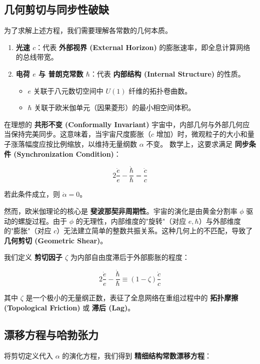\subsection{几何剪切与同步性破缺}

为了求解上述方程，我们需要理解各常数的几何本质。

\begin{enumerate}
\item \textbf{光速 $c$}：代表 \textbf{外部视界 (External Horizon)} 的膨胀速率，即全息计算网络的总线带宽。
\item \textbf{电荷 $e$ 与 普朗克常数 $\hbar$}：代表 \textbf{内部结构 (Internal Structure)} 的性质。
   \begin{itemize}
   \item $e$ 关联于八元数切空间中 $U(1)$ 纤维的拓扑卷曲数。
   \item $\hbar$ 关联于欧米伽单元（因果菱形）的最小相空间体积。
   \end{itemize}
\end{enumerate}

在理想的 \textbf{共形不变 (Conformally Invariant)} 宇宙中，内部几何与外部几何应当保持完美同步。这意味着，当宇宙尺度膨胀（$c$ 增加）时，微观粒子的大小和量子涨落幅度应按比例缩放，以维持无量纲数 $\alpha$ 不变。
数学上，这要求满足 \textbf{同步条件 (Synchronization Condition)}：

\[2\frac{\dot{e}}{e} - \frac{\dot{\hbar}}{\hbar} = \frac{\dot{c}}{c}\]

若此条件成立，则 $\dot{\alpha} = 0$。

然而，欧米伽理论的核心是 \textbf{斐波那契非周期性}。宇宙的演化是由黄金分割率 $\phi$ 驱动的螺旋过程。由于 $\phi$ 的无理性，内部维度的"旋转"（对应 $e, \hbar$）与外部维度的"膨胀"（对应 $c$）无法建立简单的整数共振关系。这种几何上的不匹配，导致了 \textbf{几何剪切 (Geometric Shear)}。

我们定义 \textbf{剪切因子 $\zeta$} 为内部自由度滞后于外部膨胀的程度：

\[2\frac{\dot{e}}{e} - \frac{\dot{\hbar}}{\hbar} \equiv (1 - \zeta) \frac{\dot{c}}{c}\]

其中 $\zeta$ 是一个极小的无量纲正数，表征了全息网络在重组过程中的 \textbf{拓扑摩擦 (Topological Friction)} 或 \textbf{滞后 (Lag)}。

\subsection{漂移方程与哈勃张力}

将剪切定义代入 $\alpha$ 的演化方程，我们得到 \textbf{精细结构常数漂移方程}：

